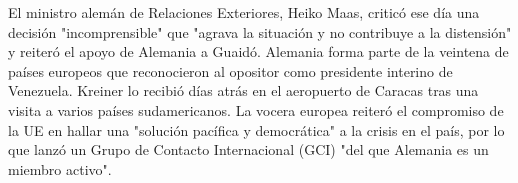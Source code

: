 \documentclass{article}%
\begin{document}
\newline%
%
El ministro alemán de Relaciones Exteriores, Heiko Maas, criticó ese día una decisión "incomprensible" que "agrava la situación y no contribuye a la distensión" y reiteró el apoyo de Alemania a Guaidó.%
\newline%
%
Alemania forma parte de la veintena de países europeos que reconocieron al opositor como presidente interino de Venezuela. Kreiner lo recibió días atrás en el aeropuerto de Caracas tras una visita a varios países sudamericanos.%
\newline%
%
La vocera europea reiteró el compromiso de la UE en hallar una "solución pacífica y democrática" a la crisis en el país, por lo que lanzó un Grupo de Contacto Internacional (GCI) "del que Alemania es un miembro activo".%
\newline%
%
\end{document}
